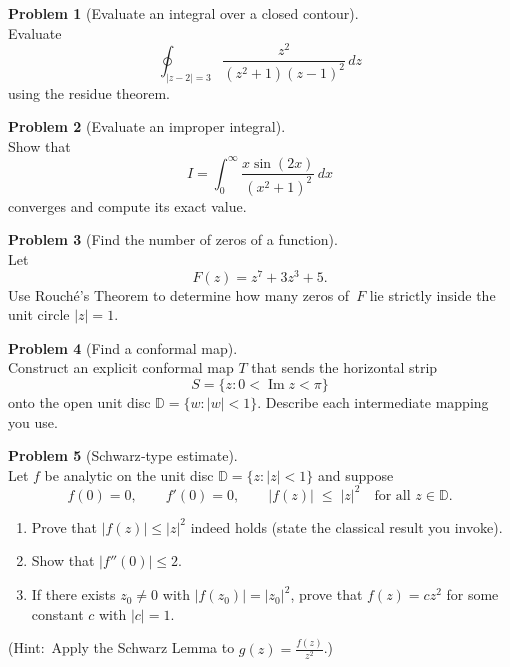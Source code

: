 \documentclass[12pt]{article}
\theoremstyle{definition} %
\newtheorem{problem}{Problem}
\theoremstyle{plain} %
\begin{document}
  \pagebreak
  \begin{problem}[Evaluate an integral over a closed contour]\mbox{}\\[4pt]
  Evaluate
  \[
    \oint_{\lvert z-2\rvert=3}\frac{z^{2}}{(z^{2}+1)(z-1)^{2}}\,dz
  \]
  using the residue theorem.
  \end{problem}
  
  \pagebreak
  \begin{problem}[Evaluate an improper integral]\mbox{}\\[4pt]
  Show that
  \[
    I=\int_{0}^{\infty}\frac{x\sin(2x)}{(x^{2}+1)^{2}}\,dx
  \]
  converges and compute its exact value.
  \end{problem}
  
  \pagebreak
  \begin{problem}[Find the number of zeros of a function]\mbox{}\\[4pt]
  Let
  \[
    F(z)=z^{7}+3z^{3}+5.
  \]
  Use Rouché’s Theorem to determine how many zeros of $F$ lie strictly inside the unit circle \(\lvert z\rvert=1\).
  \end{problem}
  
  \pagebreak
  \begin{problem}[Find a conformal map]\mbox{}\\[4pt]
  Construct an explicit conformal map \(T\) that sends the horizontal strip
  \[
    S=\{z:0<\operatorname{Im}z<\pi\}
  \]
  onto the open unit disc \(\mathbb{D}=\{w:\lvert w\rvert<1\}\).  
  Describe each intermediate mapping you use.
  \end{problem}
  
  \pagebreak
  \begin{problem}[Schwarz‑type estimate]\mbox{}\\[4pt]
  Let \(f\) be analytic on the unit disc \(\mathbb{D}=\{z:\lvert z\rvert<1\}\) and suppose
  \[
    f(0)=0,\qquad f'(0)=0,\qquad 
    \lvert f(z)\rvert\;\le\;\lvert z\rvert^{2}\quad\text{for all }z\in\mathbb{D}.
  \]
  \begin{enumerate}[label=(\alph*),itemsep=6pt]
    \item Prove that \(\lvert f(z)\rvert\le\lvert z\rvert^{2}\) indeed holds (state the classical result you invoke).
    \item Show that \(\lvert f''(0)\rvert\le 2\).
    \item If there exists \(z_{0}\neq0\) with \(\lvert f(z_{0})\rvert=\lvert z_{0}\rvert^{2}\), prove that \(f(z)=c z^{2}\) for some constant \(c\) with \(\lvert c\rvert=1\).
  \end{enumerate}
  (Hint: Apply the Schwarz Lemma to \(g(z)=\tfrac{f(z)}{z^{2}}\).)
  \end{problem}
\end{document}

